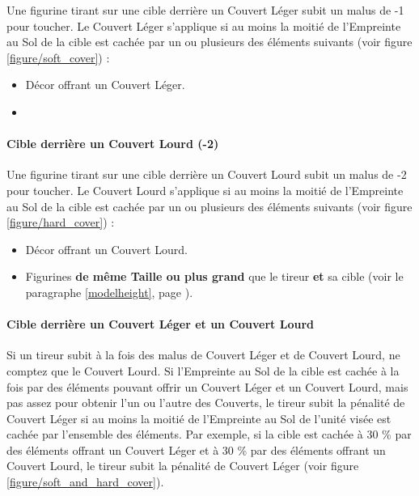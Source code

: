 Une figurine tirant sur une cible derrière un Couvert Léger subit un malus de -1 pour toucher. Le Couvert Léger s'applique si au moins la moitié de l'Empreinte au Sol de la cible est cachée par un ou plusieurs des éléments suivants (voir figure \ref{figure/soft_cover}) :
\begin{itemize}[label={-}]
\item Décor offrant un Couvert Léger.
\item {}
\end{itemize}

\paragraph{Cible derrière un Couvert Lourd (-2)}

Une figurine tirant sur une cible derrière un Couvert Lourd subit un malus de -2 pour toucher. Le Couvert Lourd s'applique si au moins la moitié de l'Empreinte au Sol de la cible est cachée par un ou plusieurs des éléments suivants (voir figure \ref{figure/hard_cover}) :
\begin{itemize}[label={-}]
\item Décor offrant un Couvert Lourd.
\item Figurines \textbf{de même Taille ou plus grand} que le tireur \textbf{et} sa cible (voir le paragraphe \ref{modelheight}, page \pageref{modelheight}).
\end{itemize}

\paragraph{Cible derrière un Couvert Léger et un Couvert Lourd}

Si un tireur subit à la fois des malus de Couvert Léger et de Couvert Lourd, ne comptez que le Couvert Lourd. Si l'Empreinte au Sol de la cible est cachée à la fois par des éléments pouvant offrir un Couvert Léger et un Couvert Lourd, mais pas assez pour obtenir l'un ou l'autre des Couverts, le tireur subit la pénalité de Couvert Léger si au moins la moitié de l'Empreinte au Sol de l'unité visée est cachée par l'ensemble des éléments. Par exemple, si la cible est cachée à 30 \% par des éléments offrant un Couvert Léger et à 30 \% par des éléments offrant un Couvert Lourd, le tireur subit la pénalité de Couvert Léger (voir figure \ref{figure/soft_and_hard_cover}).

